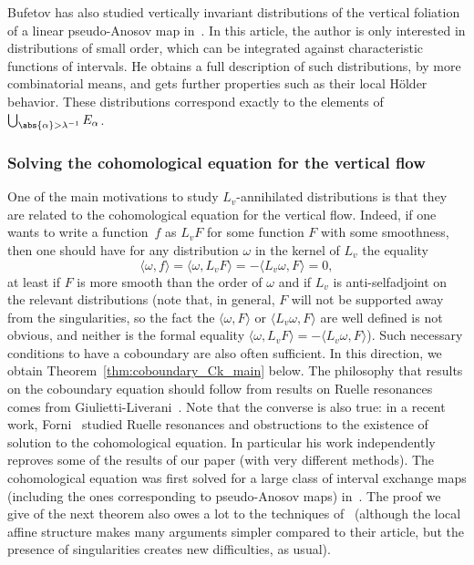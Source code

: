 \documentclass[10pt]{amsart}
\theoremstyle{definition}
\numberwithin{equation}{section}
\begin{document}
Bufetov has also studied vertically invariant distributions of the vertical
foliation of a linear pseudo-Anosov map in~\cite{bufetov_pseudo_anosov}. In
this article, the author is only interested in distributions of small order,
which can be integrated against characteristic functions of intervals. He
obtains a full description of such distributions, by more combinatorial
means, and gets further properties such as their local Hölder behavior. These
distributions correspond exactly to the elements of
$\bigcup_{\abs{\alpha}>\lambda^{-1}} E_\alpha$.

\subsubsection*{Solving the cohomological equation for the vertical flow}

One of the main motivations to study $L_v$-annihilated distributions is that
they are related to the cohomological equation for the vertical flow. Indeed,
if one wants to write a function~$f$ as $L_v F$ for some function $F$ with
some smoothness, then one should have for any distribution $\omega$ in the
kernel of $L_v$ the equality
\begin{equation}
\label{eq:woixcuyvjklmlsw<cmviw}
\langle \omega, f \rangle = \langle \omega, L_v F \rangle
= -\langle L_v \omega, F\rangle
= 0,
\end{equation}
at least if $F$ is more smooth than the order of $\omega$ and if $L_v$ is
anti-selfadjoint on the relevant distributions (note that, in general, $F$
will not be supported away from the singularities, so the fact the $\langle
\omega, F\rangle$ or $\langle L_v \omega, F\rangle$ are well defined is not
obvious, and neither is the formal equality $\langle \omega, L_v F \rangle
= -\langle L_v \omega, F\rangle$). Such necessary conditions to
have a coboundary are also often sufficient. In this direction, we obtain
Theorem~\ref{thm:coboundary_Ck_main} below. The philosophy that results on
the coboundary equation should follow from results on Ruelle resonances comes
from Giulietti-Liverani~\cite{giulietti_liverani}. Note that the converse is
also true: in a recent work, Forni~\cite{forni2018} studied Ruelle resonances
and obstructions to the existence of solution to the cohomological equation.
In particular his work independently reproves some of the results of our
paper (with very different methods). The cohomological equation was first
solved for a large class of interval exchange maps (including the ones
corresponding to pseudo-Anosov maps) in~\cite{marmi_moussa_yoccoz}. The proof
we give of the next theorem also owes a lot to the techniques
of~\cite{giulietti_liverani} (although the local affine structure makes many
arguments simpler compared to their article, but the presence of
singularities creates new difficulties, as usual).
\end{document}
